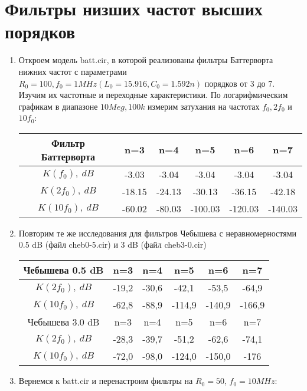 \documentclass[a4paper, 12pt]{article}%
\begin{document}
\section{Фильтры низших частот высших порядков}

\begin{enumerate}

\item Откроем модель batt.cir, в которой реализованы фильтры Баттерворта нижних частот с параметрами $R_0 = 100, f_0 = 1MHz (L_0= 15.916, C_0 = 1.592n)$ порядков от 3 до 7. Изучим их частотные и переходные характеристики. По логарифмическим графикам в диапазоне $10Meg, 100k$ измерим затухания на частотах $f_0, 2f_0$ и $10f_0$:

\begin{center}
\begin{tabular}{|c|c|c|c|c|c|}
\hline 
Фильтр Баттерворта & n=3 & n=4 & n=5 & n=6 & n=7 \\ 
\hline 
$K(f_0), \: dB$ & -3.03 & -3.04 & -3.04 & -3.04 & -3.04 \\ 
\hline 
$K(2f_0), \: dB$ & -18.15 & -24.13 & -30.13 & -36.15 & -42.18 \\ 
\hline 
$K(10f_0), \: dB$ & -60.02 & -80.03 & -100.03 & -120.03 & -140.03 \\ 
\hline 
\end{tabular} 
\end{center}

\item Повторим те же исследования для фильтров Чебышева с неравномерностями 0.5 dB (файл cheb0-5.cir) и 3 dB (файл cheb3-0.cir)

\begin{center}
\begin{tabular}{|c|c|c|c|c|c|}
\hline 
Чебышева 0.5 dB & n=3 & n=4 & n=5 & n=6 & n=7 \\ 
\hline 
$K(2f_0), \: dB$ & -19,2 & -30,6 & -42,1 & -53,5 & -64,9 \\ 
\hline 
$K(10f_0), \: dB$ & -62,8 & -88,9 & -114,9 & -140,9 & -166,9 \\ 
\hline 
Чебышева 3.0 dB & n=3 & n=4 & n=5 & n=6 & n=7 \\ 
\hline 
$K(2f_0), \: dB$ & -28,3 & -39,7 & -51,2 & -62,6 & -74,1 \\ 
\hline 
$K(10f_0), \: dB$ & -72,0 & -98,0 & -124,0 & -150,0 & -176 \\ 
\hline 
\end{tabular} 
\end{center}

\item Вернемся к batt.cir и перенастроим фильтры на $R_0 = 50$, $f_0 = 10MHz$:

\end{enumerate}
\end{document}
